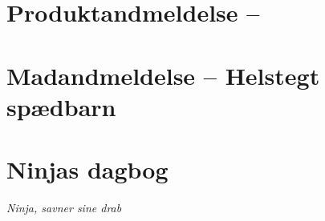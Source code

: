 \begin{minipage}[t]{100mm}
\vspace{1mm}
\section*{Produktandmeldelse -- }


\vspace{1mm}
\section*{Madandmeldelse -- Helstegt spædbarn}
\vspace{2mm}

\section*{Ninjas dagbog}

{\flushright\emph{Ninja, savner sine drab}}

\end{minipage}

